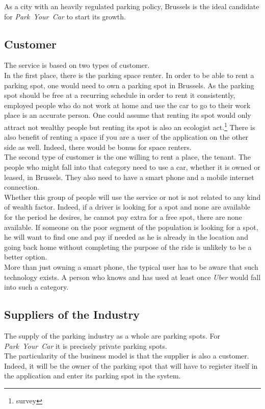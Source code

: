 \documentclass[12pt,a4paper,oneside]{book}
\newcommand{\bp}{\textit{Park~Your~Car }}
\begin{document}
As a city with an heavily regulated parking policy, Brussels is the ideal candidate for \bp to start its growth.

\subsection{Customer}
The service is based on two types of customer.\\

In the first place, there is the parking space renter. In order to be able to rent a parking spot, one would need to own a parking spot in Brussels. As the parking spot should be free at a recurring schedule in order to rent it consistently, employed people who do not work at home and use the car to go to their work place is an accurate person. One could assume that renting its spot would only attract not wealthy people but renting its spot is also an ecologist act.\footnote{survey} There is also benefit of renting a space if you are a user of the application on the other side as well. Indeed, there would be bonus for space renters.\\

The second type of customer is the one willing to rent a place, the tenant. The people who might fall into that category need to use a car, whether it is owned or leased, in Brussels. They also need to have a smart phone and a mobile internet connection.\\
Whether this group of people will use the service or not is not related to any kind of wealth factor. Indeed, if a driver is looking for a spot and none are available for the period he desires, he cannot pay extra for a free spot, there are none available. If someone on the poor segment of the population is looking for a spot, he will want to find one and pay if needed as he is already in the location and going back home without completing the purpose of the ride is unlikely to be a better option.\\
More than just owning a smart phone, the typical user has to be aware that such technology exists. A person who knows and has used at least once \textit{Uber} would fall into such a category.

\subsection{Suppliers of the Industry}
The supply of the parking industry as a whole are parking spots. For \bp it is precisely private parking spots.\\
The particularity of the business model is that the supplier is also a customer. Indeed, it will be the owner of the parking spot that will have to register itself in the application and enter its parking spot in the system.
\end{document}
